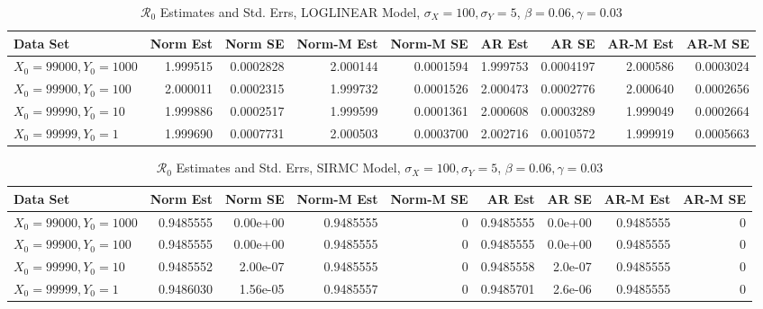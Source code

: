 \documentclass[12pt]{article}
\newcommand{\rr}{\ensuremath{\mathcal{R}_0}}
\begin{document}
\begin{table}[H]
	
	\caption{\label{tab:}$\rr$ Estimates and Std. Errs, LOGLINEAR Model,
		$\sigma_X = 100, \sigma_Y = 5$, $\beta = 0.06, \gamma = 0.03$}
	\centering
	\begin{footnotesize}
	\begin{tabular}[t]{l|r|r|r|r|r|r|r|r}
		\hline
		Data Set & Norm Est & Norm SE & Norm-M Est & Norm-M SE & AR Est & AR SE & AR-M Est & AR-M SE\\
		\hline
		$X_0 = 99000, Y_0 = 1000$ & 1.999515 & 0.0002828 & 2.000144 & 0.0001594 & 1.999753 & 0.0004197 & 2.000586 & 0.0003024\\
		\hline
		$X_0 = 99900, Y_0 = 100$ & 2.000011 & 0.0002315 & 1.999732 & 0.0001526 & 2.000473 & 0.0002776 & 2.000640 & 0.0002656\\
		\hline
		$X_0 = 99990, Y_0 = 10$ & 1.999886 & 0.0002517 & 1.999599 & 0.0001361 & 2.000608 & 0.0003289 & 1.999049 & 0.0002664\\
		\hline
		$X_0 = 99999, Y_0 = 1$ & 1.999690 & 0.0007731 & 2.000503 & 0.0003700 & 2.002716 & 0.0010572 & 1.999919 & 0.0005663\\
		\hline
	\end{tabular}
\end{footnotesize}
\end{table}
\begin{table}[H]
	
	\caption{\label{tab:}$\rr$ Estimates and Std. Errs, SIRMC Model,
		$\sigma_X = 100, \sigma_Y = 5$, $\beta = 0.06, \gamma = 0.03$}
	\centering
	\begin{footnotesize}
	\begin{tabular}[t]{l|r|r|r|r|r|r|r|r}
		\hline
		Data Set & Norm Est & Norm SE & Norm-M Est & Norm-M SE & AR Est & AR SE & AR-M Est & AR-M SE\\
		\hline
		$X_0 = 99000, Y_0 = 1000$ & 0.9485555 & 0.00e+00 & 0.9485555 & 0 & 0.9485555 & 0.0e+00 & 0.9485555 & 0\\
		\hline
		$X_0 = 99900, Y_0 = 100$ & 0.9485555 & 0.00e+00 & 0.9485555 & 0 & 0.9485555 & 0.0e+00 & 0.9485555 & 0\\
		\hline
		$X_0 = 99990, Y_0 = 10$ & 0.9485552 & 2.00e-07 & 0.9485555 & 0 & 0.9485558 & 2.0e-07 & 0.9485555 & 0\\
		\hline
		$X_0 = 99999, Y_0 = 1$ & 0.9486030 & 1.56e-05 & 0.9485557 & 0 & 0.9485701 & 2.6e-06 & 0.9485555 & 0\\
		\hline
	\end{tabular}
\end{footnotesize}
\end{table}
\end{document}
